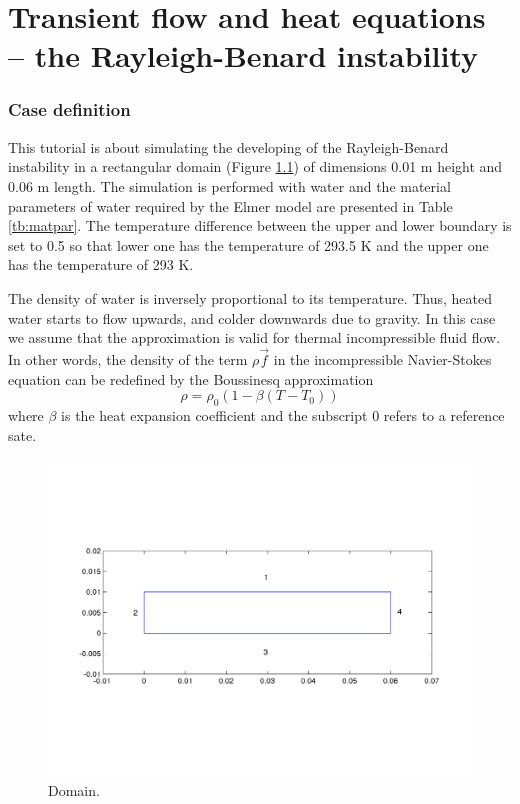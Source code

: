 \chapter{Transient flow and heat equations -- the Rayleigh-Benard instability}


\subsection*{Case definition}

This tutorial is about simulating the developing of the
Rayleigh-Benard instability in a rectangular domain  (Figure
\ref{fg:rb_geometry}) of dimensions 0.01 m height and 0.06 m
length. The simulation is performed with water and the material
parameters of water required by the Elmer model are presented in Table \ref{tb:matpar}. The
temperature difference between the upper and lower boundary is set to
0.5 so that lower one has the temperature of  293.5 K and the upper
one has the temperature of 293 K.


The density of water is inversely proportional to its
temperature. Thus, heated water starts to flow upwards, and colder
downwards due to gravity.  In this case we assume that the
 approximation is valid for thermal incompressible
fluid flow. In other words, the density of the term $\rho$$\vec{f}$ in
the incompressible Navier-Stokes equation can be redefined by the
Boussinesq approximation
\begin{displaymath}
\rho = {\rho}_0(1-\beta(T-{T}_0))
\end{displaymath}
where $\beta$ is the heat expansion coefficient and the subscript 0 refers to a reference sate.


\begin{figure}[h]
\centering
\includegraphics[width=150 mm, height=55 mm]{rb_geometry}
\caption{Domain.}\label{fg:rb_geometry}
\end{figure}  


